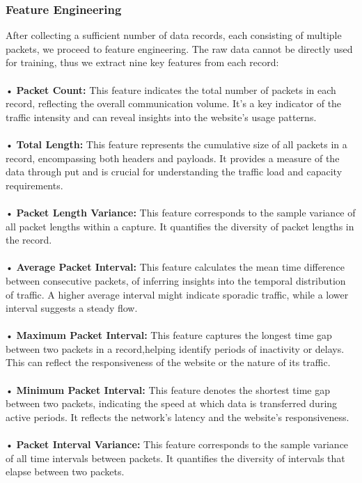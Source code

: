 \documentclass[10pt,sigconf,letterpaper,nonacm]{acmart}
\begin{document}
\subsubsection{Feature Engineering}
After collecting a sufficient number of data records, each consisting of multiple packets, we
proceed to feature engineering. The raw data cannot be directly used for training, thus we extract nine key features from each record:\\\\
• \textbf{Packet Count:} This feature indicates the total number
of packets in each record, reflecting the overall communication volume. It’s a key indicator of the traffic intensity
and can reveal insights into the website’s usage patterns.\\\\
• \textbf{Total Length:} This feature represents the cumulative
size of all packets in a record, encompassing both headers
and payloads. It provides a measure of the data through
put and is crucial for understanding the traffic load and
capacity requirements.\\\\
• \textbf{Packet Length Variance:} This feature corresponds to the sample variance of all packet lengths within a capture. It quantifies the diversity of packet lengths in the record.\\\\
• \textbf{Average Packet Interval:} This feature calculates the
mean time difference between consecutive packets, of inferring insights into the temporal distribution of traffic. A
higher average interval might indicate sporadic traffic,
while a lower interval suggests a steady flow.\\\\
• \textbf{Maximum Packet Interval:} This feature captures the
longest time gap between two packets in a record,helping
identify periods of inactivity or delays. This can reflect the responsiveness of the website or the nature of its
traffic.\\\\
• \textbf{Minimum Packet Interval:} This feature denotes the
shortest time gap between two packets, indicating the
speed at which data is transferred during active periods. It reflects the network’s latency and the website’s
responsiveness.\\\\
• \textbf{Packet Interval Variance:} This feature corresponds to the sample variance of all time intervals between packets. It quantifies the diversity of intervals that elapse between two packets.\\\\
\end{document}
